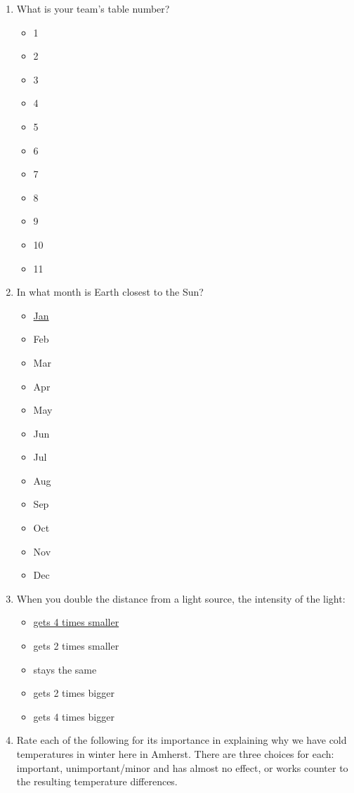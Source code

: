 \documentclass[12pt]{article}
\begin{document}
\begin{enumerate}
\item
What is your team's table number?
\begin{itemize}
    \item 1
    \item 2
    \item 3
    \item 4
    \item 5
    \item 6
    \item 7
    \item 8
    \item 9
    \item 10
    \item 11
\end{itemize}
\item
In what month is Earth closest to the Sun?
\begin{itemize}
    \item \underline{Jan}
    \item Feb
    \item Mar
    \item Apr
    \item May
    \item Jun
    \item Jul
    \item Aug
    \item Sep
    \item Oct
    \item Nov
    \item Dec
\end{itemize}
\item
When you double the distance from a light source, the intensity of the light:
\begin{itemize}
    \item \underline{gets 4 times smaller}
    \item gets 2 times smaller
    \item stays the same
    \item gets 2 times bigger
    \item gets 4 times bigger 
\end{itemize}
\item
Rate each of the following for its importance in explaining why we have cold temperatures in winter here in Amherst. There are three choices for each: important, unimportant/minor and has almost no effect, or works counter to the resulting temperature differences.
\begin{enumerate}[a.]

\end{enumerate}
\end{enumerate}
\end{document}
